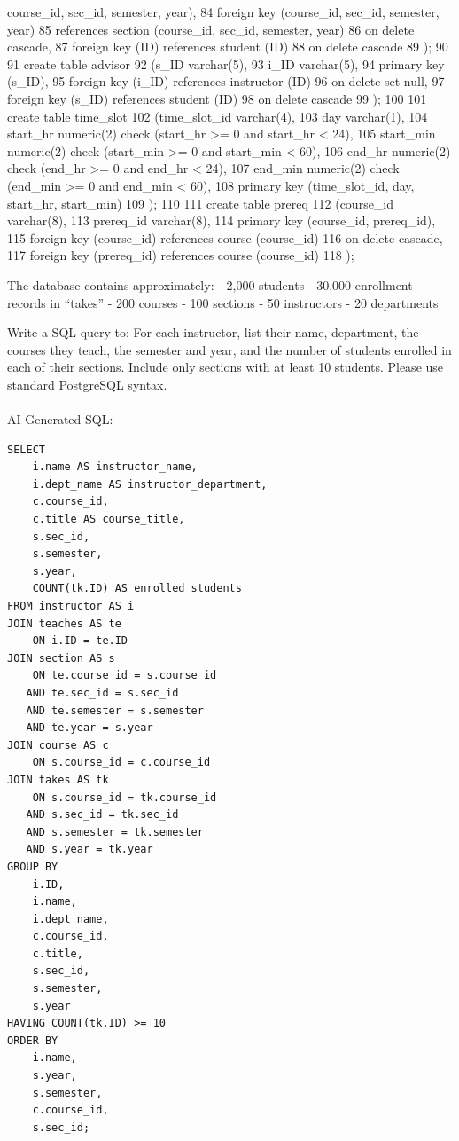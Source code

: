 \documentclass[
  letterpaper,
  DIV=11,
  numbers=noendperiod]{scrartcl}
\makeatletter
\let\oldparagraph\paragraph
\renewcommand{\paragraph}{
    \@ifstar
      \xxxParagraphStar
      \xxxParagraphNoStar
  }
\newcommand{\xxxParagraphStar}[1]{\oldparagraph*{#1}\mbox{}}
\newcommand{\xxxParagraphNoStar}[1]{\oldparagraph{#1}\mbox{}}
\makeatother
\begin{document}
course\_id, sec\_id, semester, year), 84 foreign key (course\_id,
sec\_id, semester, year) 85 references section (course\_id, sec\_id,
semester, year) 86 on delete cascade, 87 foreign key (ID) references
student (ID) 88 on delete cascade 89 ); 90 91 create table advisor 92
(s\_ID varchar(5), 93 i\_ID varchar(5), 94 primary key (s\_ID), 95
foreign key (i\_ID) references instructor (ID) 96 on delete set null, 97
foreign key (s\_ID) references student (ID) 98 on delete cascade 99 );
100 101 create table time\_slot 102 (time\_slot\_id varchar(4), 103 day
varchar(1), 104 start\_hr numeric(2) check (start\_hr \textgreater= 0
and start\_hr \textless{} 24), 105 start\_min numeric(2) check
(start\_min \textgreater= 0 and start\_min \textless{} 60), 106 end\_hr
numeric(2) check (end\_hr \textgreater= 0 and end\_hr \textless{} 24),
107 end\_min numeric(2) check (end\_min \textgreater= 0 and end\_min
\textless{} 60), 108 primary key (time\_slot\_id, day, start\_hr,
start\_min) 109 ); 110 111 create table prereq 112 (course\_id
varchar(8), 113 prereq\_id varchar(8), 114 primary key (course\_id,
prereq\_id), 115 foreign key (course\_id) references course (course\_id)
116 on delete cascade, 117 foreign key (prereq\_id) references course
(course\_id) 118 );

The database contains approximately: - 2,000 students - 30,000
enrollment records in ``takes'' - 200 courses - 100 sections - 50
instructors - 20 departments

Write a SQL query to: For each instructor, list their name, department,
the courses they teach, the semester and year, and the number of
students enrolled in each of their sections. Include only sections with
at least 10 students. Please use standard PostgreSQL syntax.

\paragraph{AI-Generated SQL:}\label{ai-generated-sql-1}

\begin{verbatim}
SELECT
    i.name AS instructor_name,
    i.dept_name AS instructor_department,
    c.course_id,
    c.title AS course_title,
    s.sec_id,
    s.semester,
    s.year,
    COUNT(tk.ID) AS enrolled_students
FROM instructor AS i
JOIN teaches AS te
    ON i.ID = te.ID
JOIN section AS s
    ON te.course_id = s.course_id
   AND te.sec_id = s.sec_id
   AND te.semester = s.semester
   AND te.year = s.year
JOIN course AS c
    ON s.course_id = c.course_id
JOIN takes AS tk
    ON s.course_id = tk.course_id
   AND s.sec_id = tk.sec_id
   AND s.semester = tk.semester
   AND s.year = tk.year
GROUP BY
    i.ID,
    i.name,
    i.dept_name,
    c.course_id,
    c.title,
    s.sec_id,
    s.semester,
    s.year
HAVING COUNT(tk.ID) >= 10
ORDER BY
    i.name,
    s.year,
    s.semester,
    c.course_id,
    s.sec_id;
\end{verbatim}
\end{document}
